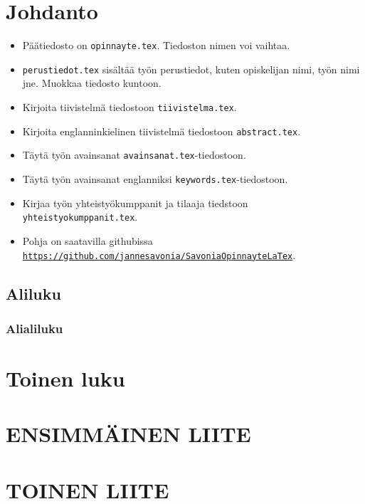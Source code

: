 


\usepackage{hyperref}





\section{Johdanto}
\begin{itemize}
\item Päätiedosto on \texttt{opinnayte.tex}. Tiedoston nimen voi vaihtaa.
\item \texttt{perustiedot.tex} sisältää työn perustiedot, kuten opiskelijan nimi, työn nimi jne. Muokkaa tiedosto kuntoon.
\item Kirjoita tiivistelmä tiedostoon \texttt{tiivistelma.tex}.
\item Kirjoita englanninkielinen tiivistelmä tiedostoon \texttt{abstract.tex}.
\item Täytä työn avainsanat \texttt{avainsanat.tex}-tiedostoon.
\item Täytä työn avainsanat englanniksi \texttt{keywords.tex}-tiedostoon.
\item Kirjaa työn yhteistyökumppanit ja tilaaja tiedstoon \texttt{yhteistyokumppanit.tex}.
\item Pohja on saatavilla githubissa \href{https://github.com/jannesavonia/SavoniaOpinnayteLaTex}{\texttt{https://github.com/jannesavonia/SavoniaOpinnayteLaTex}}. 
\end{itemize}

\subsection{Aliluku}

\subsubsection{Alialiluku}

\section{Toinen luku}

\pagebreak
\appendix

\section{ENSIMMÄINEN LIITE}

\section{TOINEN LIITE}


